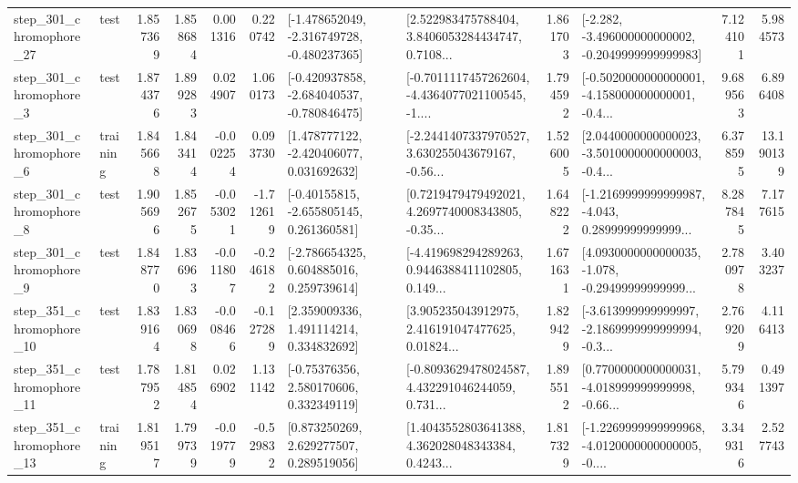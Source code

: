 \begin{tabular}{llrrrrllrlrr}
  step\_301\_chromophore\_27 &      test &      1.857369 &    1.858684 &      0.001316 &  0.220742 &  [-1.478652049, -2.316749728, -0.480237365] &  [2.522983475788404, 3.8406053284434747, 0.7108... &       1.861703 &  [-2.282, -3.496000000000002, -0.2049999999999983] &            7.124101 &          5.984573 \\
   step\_301\_chromophore\_3 &      test &      1.874376 &    1.899283 &      0.024907 &  1.060173 &  [-0.420937858, -2.684040537, -0.780846475] &  [-0.7011117457262604, -4.4364077021100545, -1.... &       1.794592 &  [-0.5020000000000001, -4.158000000000001, -0.4... &            9.689563 &          6.896408 \\
   step\_301\_chromophore\_6 &  training &      1.845668 &    1.843414 &     -0.002254 &  0.093730 &    [1.478777122, -2.420406077, 0.031692632] &  [-2.2441407337970527, 3.630255043679167, -0.56... &       1.526005 &  [2.0440000000000023, -3.5010000000000003, -0.4... &            6.378595 &         13.190139 \\
   step\_301\_chromophore\_8 &      test &      1.905696 &    1.852675 &     -0.053021 & -1.712619 &    [-0.40155815, -2.655805145, 0.261360581] &  [0.7219479479492021, 4.2697740008343805, -0.35... &       1.648222 &  [-1.2169999999999987, -4.043, 0.28999999999999... &            8.287845 &          7.177615 \\
   step\_301\_chromophore\_9 &      test &      1.848770 &    1.836963 &     -0.011807 & -0.246182 &    [-2.786654325, 0.604885016, 0.259739614] &  [-4.419698294289263, 0.9446388411102805, 0.149... &       1.671631 &  [4.0930000000000035, -1.078, -0.29499999999999... &            2.780978 &          3.403237 \\
  step\_351\_chromophore\_10 &      test &      1.839164 &    1.830698 &     -0.008466 & -0.127289 &     [2.359009336, 1.491114214, 0.334832692] &  [3.905235043912975, 2.416191047477625, 0.01824... &       1.829429 &  [-3.613999999999997, -2.1869999999999994, -0.3... &            2.769209 &          4.116413 \\
  step\_351\_chromophore\_11 &      test &      1.787952 &    1.814854 &      0.026902 &  1.131142 &     [-0.75376356, 2.580170606, 0.332349119] &  [-0.8093629478024587, 4.432291046244059, 0.731... &       1.895512 &  [0.7700000000000031, -4.018999999999998, -0.66... &            5.799346 &          0.491397 \\
  step\_351\_chromophore\_13 &  training &      1.819517 &    1.799739 &     -0.019779 & -0.529832 &     [0.873250269, 2.629277507, 0.289519056] &  [1.4043552803641388, 4.362028048343384, 0.4243... &       1.817329 &  [-1.2269999999999968, -4.0120000000000005, -0.... &            3.349316 &          2.527743 \\

\end{tabular}
